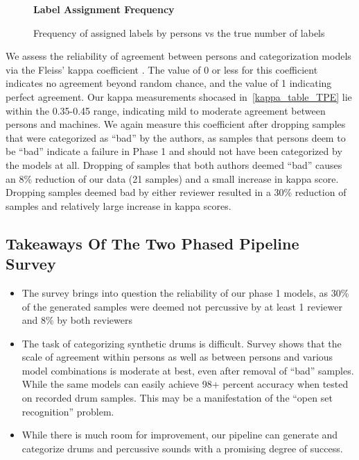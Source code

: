 \documentclass[\main/thesis.tex]{subfiles}
\begin{document}
\begin{figure}[h!]
    \begin{center}
    \textbf{Label Assignment Frequency}
    \end{center}
    \caption{Frequency of assigned labels by persons vs the true number of labels}
\label{fig:freq-survey-2p}
\end{figure}
We assess the reliability of agreement between persons and categorization models via the Fleiss' kappa coefficient \cite{fleiss1971measuring}. The value of 0 or less for this coefficient indicates no agreement beyond random chance, and the value of 1 indicating perfect agreement. Our kappa measurements shocased in~\ref{kappa_table_TPE} lie within the 0.35-0.45 range, indicating mild to moderate agreement between persons and machines. We again measure this coefficient after dropping samples that were categorized as \enquote{bad} by the authors, as samples that persons deem to be \enquote{bad} indicate a failure in Phase 1 and should not have been categorized by the models at all. Dropping of samples that both authors deemed \enquote{bad} causes an 8\% reduction of our data (21 samples) and a small increase in kappa score. Dropping samples deemed bad by either reviewer resulted in a 30\% reduction of samples and relatively large increase in kappa scores. 

\subsection{Takeaways Of The Two Phased Pipeline Survey}
\label{survey1_takeaway}
\begin{itemize}
    \item The survey brings into question the reliability of our phase 1 models, as 30\% of the generated samples were deemed not percussive by at least 1 reviewer and 8\% by both reviewers
    \item The task of categorizing synthetic drums is difficult. Survey shows that the scale of agreement within persons as well as between persons and various model combinations is moderate at best, even after removal of \enquote{bad} samples.  While the same models can easily achieve 98+ percent accuracy when tested on recorded drum samples. This may be a manifestation of the \enquote{open set recognition} problem. 
    \item While there is much room for improvement, our pipeline can generate and categorize drums and percussive sounds with a promising degree of success. 
\end{itemize}
\end{document}
